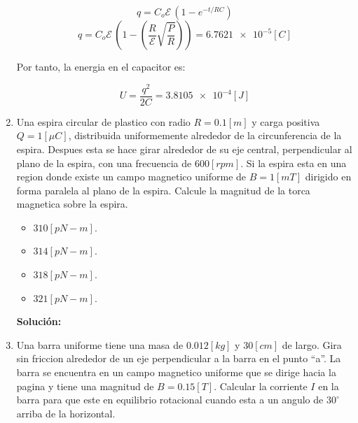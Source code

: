 \documentclass[letter,11pt]{article}
\begin{document}
\begin{enumerate}
\begin{equation*}
    q = C_o\mathcal{E}\,(1-e^{-t/RC})
\end{equation*}
\begin{equation*}
    q = C_o\mathcal{E}\,\left(1-\left(
        \frac{R}{\mathcal{E}}\sqrt{\frac{P}{R}}\right)\right)
      = \num{6.7621e-5} [C]
\end{equation*}

Por tanto, la energia en el capacitor es:

\begin{equation*}
    U = \frac{q^2}{2C} = \num{3.8105e-4} [J]
\end{equation*}

\item Una espira circular de plastico con radio $R = 0.1 [m]$ y carga positiva
$Q = 1 [\mu C]$, distribuida uniformemente alrededor de la circunferencia de la
espira. Despues esta se hace girar alrededor de su eje central, perpendicular al
plano de la espira, con una frecuencia de $600 [rpm]$. Si la espira esta en una
region donde existe un campo magnetico uniforme de $B = 1 [mT]$ dirigido en
forma paralela al plano de la espira. Calcule la magnitud de la torca magnetica
sobre la espira.

\begin{itemize}
    \item $310 [pN-m]$.
    \item $314 [pN-m]$.
    \item $318 [pN-m]$.
    \item $321 [pN-m]$.
\end{itemize}

\textbf{Solución:}

\item Una barra uniforme tiene una masa de $0.012 [kg]$ y $30 [cm]$ de largo.
Gira sin friccion alrededor de un eje perpendicular a la barra en el punto
``a''. La barra se encuentra en un campo magnetico uniforme que se dirige hacia
la pagina y tiene una magnitud de $B = 0.15 [T]$. Calcular la corriente $I$ en
la barra para que este en equilibrio rotacional cuando esta a un angulo de
$30^\circ$ arriba de la horizontal.


\end{enumerate}
\end{document}
